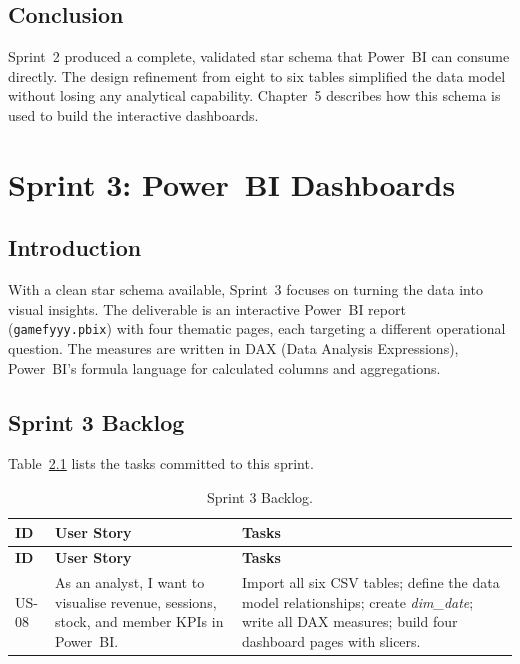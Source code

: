 \section{Conclusion}

Sprint~2 produced a complete, validated star schema that Power~BI can consume
directly. The design refinement from eight to six tables simplified the data model
without losing any analytical capability. Chapter~5 describes how this schema is used
to build the interactive dashboards.

\chapter{Sprint 3: Power~BI Dashboards}

\section{Introduction}

With a clean star schema available, Sprint~3 focuses on turning the data into visual
insights. The deliverable is an interactive Power~BI report (\texttt{gamefyyy.pbix})
with four thematic pages, each targeting a different operational question. The
measures are written in DAX (Data Analysis Expressions), Power~BI's formula language
for calculated columns and aggregations.

\section{Sprint 3 Backlog}

Table~\ref{tab:sprint3_backlog} lists the tasks committed to this sprint.

\begin{longtable}{>{\bfseries}p{1.3cm} p{4.2cm} p{7cm}}
  \caption{Sprint 3 Backlog.\label{tab:sprint3_backlog}} \\
  \toprule
  \textbf{ID} & \textbf{User Story} & \textbf{Tasks} \\
  \midrule
  \endfirsthead
  \toprule
  \textbf{ID} & \textbf{User Story} & \textbf{Tasks} \\
  \midrule
  \endhead
  \bottomrule
  \endfoot

  US-08 & As an analyst, I want to visualise revenue, sessions, stock, and
          member KPIs in Power~BI.
        & Import all six CSV tables; define the data model relationships; create
          \textit{dim\_date}; write all DAX measures; build four dashboard pages
          with slicers. \\
\end{longtable}

